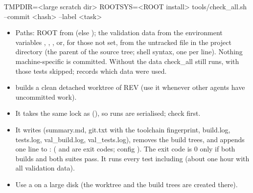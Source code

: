 \begin{simcshell}[basicstyle=\ttfamily\scriptsize]
TMPDIR=<large scratch dir> ROOTSYS=<ROOT install> tools/check_all.sh --commit <hash> --label <task>
\end{simcshell}
\begin{itemize}
\item Paths: ROOT from  (else ); the validation data from the environment variables
, , , or, for those not set, from the untracked file  in
the project directory (the parent of the source tree; shell syntax, one  per line). Nothing machine-specific
is committed. Without the data check\_all still runs, with those tests skipped;  records which data were used.
\item {} builds a clean detached worktree of REV (use it whenever other agents have uncommitted work).
\item It takes the same lock as  (), so runs are serialised; check  first.
\item It writes  (summary.\allowbreak{}md,\allowbreak{} git.txt with the toolchain
fingerprint,\allowbreak{} build.log, tests.log, val\_\allowbreak{}build.\allowbreak{}log,\allowbreak{} val\_\allowbreak{}tests.\allowbreak{}log),\allowbreak{} removes the build trees, and appends one line to
:  ( and  are
 exit codes; config ). The exit code is 0 only if both builds and both
suites pass. It runs every test including  (about one hour with all validation data).
\item Use a  on a large disk (the worktree and the build trees are created there).
\end{itemize}
